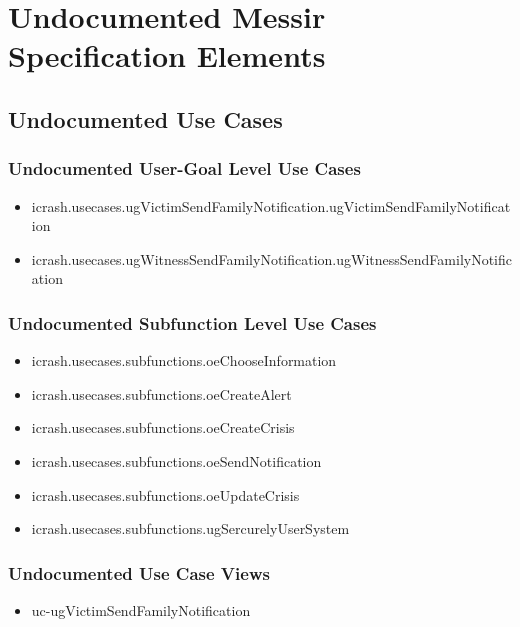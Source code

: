 	
\chapter{Undocumented Messir Specification Elements}


\section[Undocumented Use Cases]{Undocumented Use Cases}


\subsection[Undocumented Use Cases - User-Goal Level]{Undocumented User-Goal Level Use Cases}
\begin{itemize}
\item icrash.usecases.ugVictimSendFamilyNotification.ugVictimSendFamilyNotification 
\item icrash.usecases.ugWitnessSendFamilyNotification.ugWitnessSendFamilyNotification 
\end{itemize}

\subsection[Undocumented Use Cases - Subfunction Level]{Undocumented Subfunction Level Use Cases}
\begin{itemize}
\item icrash.usecases.subfunctions.oeChooseInformation 
\item icrash.usecases.subfunctions.oeCreateAlert 
\item icrash.usecases.subfunctions.oeCreateCrisis 
\item icrash.usecases.subfunctions.oeSendNotification 
\item icrash.usecases.subfunctions.oeUpdateCrisis 
\item icrash.usecases.subfunctions.ugSercurelyUserSystem 
\end{itemize}

\subsection[Undocumented Use Case Views]{Undocumented Use Case Views}
\begin{itemize}
\item uc-ugVictimSendFamilyNotification 
\end{itemize}




